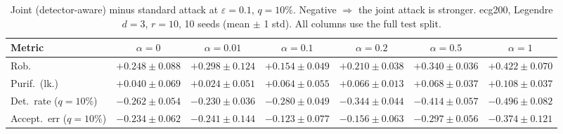 \begin{table}[htbp]
  \centering
  \small
  \begin{tabular}{@{}lcccccc@{}}
    \toprule
    Metric & $\alpha{=}0$ & $\alpha{=}0.01$ & $\alpha{=}0.1$ & $\alpha{=}0.2$ & $\alpha{=}0.5$ & $\alpha{=}1$ \\
    \midrule
    Rob. & $+0.248 \pm 0.088$ & $+0.298 \pm 0.124$ & $+0.154 \pm 0.049$ & $+0.210 \pm 0.038$ & $+0.340 \pm 0.036$ & $+0.422 \pm 0.070$ \\
    Purif.\ (lk.) & $+0.040 \pm 0.069$ & $+0.024 \pm 0.051$ & $+0.064 \pm 0.055$ & $+0.066 \pm 0.013$ & $+0.068 \pm 0.037$ & $+0.108 \pm 0.037$ \\
    Det.\ rate ($q{=}10\%$) & $-0.262 \pm 0.054$ & $-0.230 \pm 0.036$ & $-0.280 \pm 0.049$ & $-0.344 \pm 0.044$ & $-0.414 \pm 0.057$ & $-0.496 \pm 0.082$ \\
    Accept.\ err ($q{=}10\%$) & $-0.234 \pm 0.062$ & $-0.241 \pm 0.144$ & $-0.123 \pm 0.077$ & $-0.156 \pm 0.063$ & $-0.297 \pm 0.056$ & $-0.374 \pm 0.121$ \\
    \bottomrule
  \end{tabular}
  \caption{Joint (detector-aware) minus standard attack at $\varepsilon=0.1$, $q{=}10\%$. Negative $\Rightarrow$ the joint attack is stronger. ecg200, Legendre $d{=}3$, $r{=}10$, 10 seeds (mean $\pm$ 1 std). All columns use the full test split.}
  \label{tab:ecg200_joint_r10_eps0.1}
\end{table}
